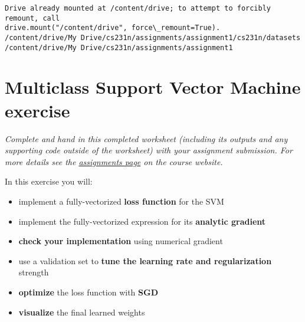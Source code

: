 \documentclass[11pt]{article}
\providecommand{\tightlist}{%
      \setlength{\itemsep}{0pt}\setlength{\parskip}{0pt}}
\begin{document}
    \begin{Verbatim}[commandchars=\\\{\}]
Drive already mounted at /content/drive; to attempt to forcibly remount, call
drive.mount("/content/drive", force\_remount=True).
/content/drive/My Drive/cs231n/assignments/assignment1/cs231n/datasets
/content/drive/My Drive/cs231n/assignments/assignment1
    \end{Verbatim}

    \hypertarget{multiclass-support-vector-machine-exercise}{%
\section{Multiclass Support Vector Machine
exercise}\label{multiclass-support-vector-machine-exercise}}

\emph{Complete and hand in this completed worksheet (including its
outputs and any supporting code outside of the worksheet) with your
assignment submission. For more details see the
\href{http://vision.stanford.edu/teaching/cs231n/assignments.html}{assignments
page} on the course website.}

In this exercise you will:

\begin{itemize}
\tightlist
\item
  implement a fully-vectorized \textbf{loss function} for the SVM
\item
  implement the fully-vectorized expression for its \textbf{analytic
  gradient}
\item
  \textbf{check your implementation} using numerical gradient
\item
  use a validation set to \textbf{tune the learning rate and
  regularization} strength
\item
  \textbf{optimize} the loss function with \textbf{SGD}
\item
  \textbf{visualize} the final learned weights
\end{itemize}
\end{document}
